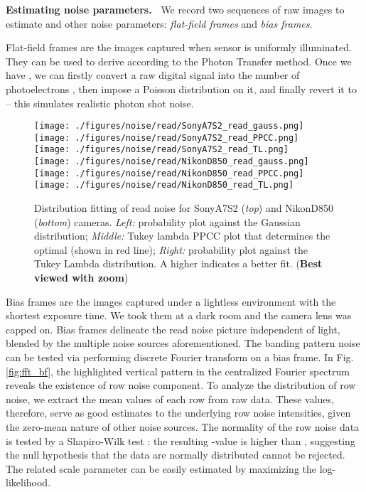 \documentclass[10pt,twocolumn,letterpaper]{article}
\begin{document}
\vspace{3pt}
\noindent\textbf{Estimating noise parameters.~}
We record two sequences of raw images to estimate  and other noise parameters: \emph{flat-field
frames} and \emph{bias frames}.



Flat-field frames are the images captured when sensor is uniformly illuminated.
They can be used to derive  according to the Photon Transfer method.
\cite{Janesick1985CCD}Once we have , we can firstly convert a raw digital signal  into the number of photoelectrons , then impose a Poisson distribution on it, and finally revert it to  -- this simulates realistic photon shot noise.



\begin{figure}[!t]
\centering
\texttt{[image: ./figures/noise/read/SonyA7S2\_read\_gauss.png]}
\texttt{[image: ./figures/noise/read/SonyA7S2\_read\_PPCC.png]}
\texttt{[image: ./figures/noise/read/SonyA7S2\_read\_TL.png]} \\
\texttt{[image: ./figures/noise/read/NikonD850\_read\_gauss.png]}
\texttt{[image: ./figures/noise/read/NikonD850\_read\_PPCC.png]}
\texttt{[image: ./figures/noise/read/NikonD850\_read\_TL.png]} \\
\vspace{-1mm}
\caption{Distribution fitting of read noise for SonyA7S2 (\textit{top}) and  NikonD850 (\textit{bottom}) cameras. \textit{Left:} probability plot against the Gaussian distribution;
\textit{Middle:} Tukey lambda PPCC plot that determines the optimal  (shown in red line); \textit{Right:} probability plot against the Tukey Lambda distribution. A higher  indicates a better fit. (\textbf{Best viewed with zoom})}
\vspace{0mm}
\label{fig:TL-PPCC}
\end{figure}

Bias frames are the images captured under a lightless environment with the
shortest exposure time. We took them at a dark room and the camera lens was capped on. 
Bias frames delineate the read noise picture independent of light, blended by the multiple noise sources aforementioned. 
The banding pattern noise can be tested via performing discrete Fourier transform on a bias frame.  In Fig.\ref{fig:fft_bf},  the highlighted vertical pattern in the centralized Fourier spectrum reveals the existence of row noise component. 
To analyze the distribution of row noise, we extract the
mean values of each row from raw data. These values, therefore, serve as good
estimates to the underlying row noise intensities, given the zero-mean nature
of other noise sources.  
The normality
of the row noise data is tested by a Shapiro-Wilk test \cite{Shapiro1975An}: the resulting -value is higher than , suggesting the null hypothesis that the data are normally distributed cannot be rejected. 
The related scale parameter  can be easily
estimated by maximizing the log-likelihood.
\end{document}
